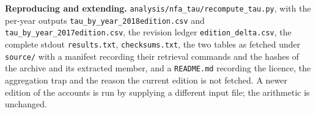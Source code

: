\documentclass[11pt]{article}
\begin{document}
\textbf{Reproducing and extending.} \texttt{analysis/\allowbreak{}nfa\_tau/\allowbreak{}recompute\_ta\allowbreak{}u.\allowbreak{}py}, with the per-year outputs \texttt{tau\_by\_year\_\allowbreak{}2018edition.\allowbreak{}csv} and \texttt{tau\_by\_year\_\allowbreak{}2017edition.\allowbreak{}csv}, the revision ledger \texttt{edition\_delt\allowbreak{}a.\allowbreak{}csv}, the complete stdout \texttt{results.\allowbreak{}txt}, \texttt{checksums.\allowbreak{}txt}, the two tables as fetched under \texttt{source/} with a manifest recording their retrieval commands and the hashes of the archive and its extracted member, and a \texttt{README.\allowbreak{}md} recording the licence, the aggregation trap and the reason the current edition is not fetched. A newer edition of the accounts is run by supplying a different input file; the arithmetic is unchanged.
\end{document}
